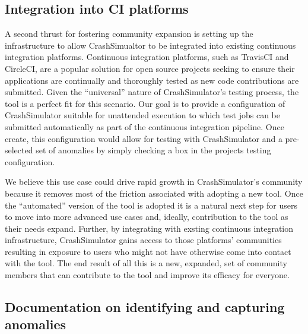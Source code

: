 \documentclass[twocolumn]{article}
\begin{document}
\subsection{Integration into CI platforms}

A second thrust for fostering community expansion is setting up the
infrastructure to allow CrashSimualtor to be integrated into existing
continuous integration platforms.  Continuous integration platforms, such
as TravisCI and CircleCI, are a popular solution for open source projects
seeking to ensure their applications are continually and thoroughly tested
as new code contributions are submitted.  Given the ``universal'' nature of
CrashSimulator's testing process, the tool is a perfect fit for this
scenario.  Our goal is to provide a configuration of CrashSimulator
suitable for unattended execution to which test jobs can be submitted
automatically as part of the continuous integration pipeline.  Once create,
this configuration would allow for testing with CrashSimulator and a
pre-selected set of anomalies by simply checking a box in the projects
testing configuration.

We believe this use case could drive rapid growth in CrashSimulator's
community because it removes most of the friction associated with adopting
a new tool.  Once the ``automated'' version of the tool is adopted it is a
natural next step for users to move into more advanced use cases and,
ideally, contribution to the tool as their needs expand.  Further, by
integrating with exsting continuous integration infrastructure,
CrashSimulator gains access to those platforms' communities resulting in
exposure to users who might not have otherwise come into contact with the
tool.  The end result of all this is a new, expanded, set of community
members that can contribute to the tool and improve its efficacy for
everyone.

\subsection{Documentation on identifying and capturing anomalies}
\end{document}

